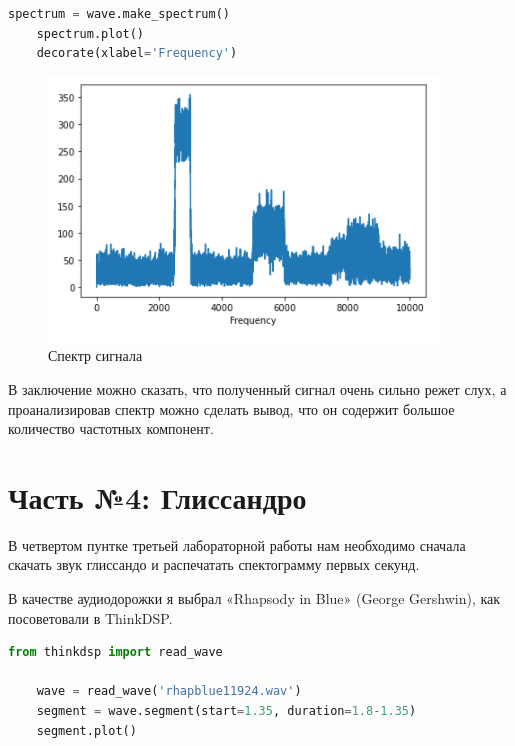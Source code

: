 \documentclass[a4paper]{article}
\begin{document}
\begin{lstlisting}[language=Python, caption= Спектр сигнала]
    spectrum = wave.make_spectrum()
    spectrum.plot()
    decorate(xlabel='Frequency')
\end{lstlisting}               
            
            \begin{figure}[H]
                \centering
                \includegraphics{ex_3_wave_spectr.png}
                \caption{Спектр сигнала}
                \label{fig:ex_3_wave_spectr}
            \end{figure}
            
            В заключение можно сказать, что полученный сигнал очень сильно режет слух, а проанализировав спектр можно сделать вывод, что он содержит большое количество частотных компонент.
            
    \newpage
        \section{Часть №4: Глиссандро}
            В четвертом пунтке третьей лабораторной работы нам необходимо сначала скачать звук глиссандо и распечатать спектограмму первых секунд.
            
            В качестве аудиодорожки я выбрал «Rhapsody in Blue» (George Gershwin), как посоветовали в ThinkDSP.
            
\begin{lstlisting}[language=Python, caption= Получение сегмена из аудиофайла]
    from thinkdsp import read_wave

    wave = read_wave('rhapblue11924.wav')
    segment = wave.segment(start=1.35, duration=1.8-1.35)
    segment.plot()
\end{lstlisting}   
            
\end{document}
